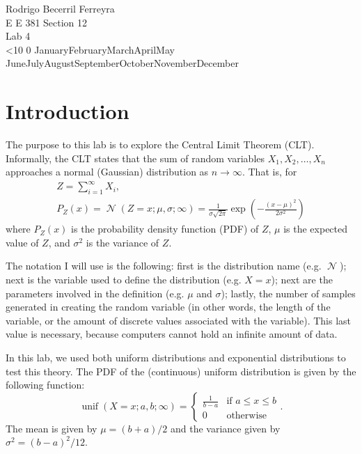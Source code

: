 \documentclass{article}
\renewcommand{\today}{\ifnum\number\day<10 0\fi \number\day \space%
\ifcase \month \or January\or February\or March\or April\or May%
\or June\or July\or August\or September\or October\or November\or December\fi\space%
\number \year}
\DeclareMathOperator{\norm}{\mathcal{N}}
\DeclareMathOperator{\unif}{unif}
\begin{document}
    \noindent
    Rodrigo Becerril Ferreyra\\
    E E 381 Section 12\\
    Lab 4\\
    \today

\section*{Introduction} The purpose to this lab is to explore
the Central Limit Theorem (CLT). Informally, the CLT states
that the sum of random variables \(X_1, X_2, \ldots, X_n\)
approaches a normal (Gaussian) distribution as \(n\to\infty\).
That is, for
\begin{gather*}
    Z = \sum_{i=1}^\infty X_i,\\
    P_Z(x) = \norm(Z = x; \mu, \sigma; \infty) = \frac1{\sigma\sqrt{2\pi}}\exp\left(-\frac{\left(x-\mu\right)^2}{2\sigma^2}\right)
\end{gather*} where \(P_Z(x)\) is the probability density
function (PDF) of \(Z\), \(\mu\) is the expected value of \(Z\),
and \(\sigma^2\) is the variance of \(Z\).

The notation I will use is the following: first is the
distribution name (e.g. \(\norm\)); next is the variable used to define
the distribution (e.g. \(X= x\)); next are the parameters
involved in the definition (e.g. \(\mu\) and \(\sigma\));
lastly, the number of samples generated in creating the
random variable (in other words, the length of the variable,
or the amount of discrete values associated with the variable).
This last value is necessary, because computers cannot
hold an infinite amount of data.

In this lab, we used both uniform distributions and
exponential distributions to test this theory. The PDF of the
(continuous) uniform distribution is given by the following
function:
\begin{equation*}
    \unif(X = x; a, b; \infty) =
    \begin{cases}
        \frac{1}{b-a} & \text{if } a \le x \le b\\
        0             & \text{otherwise}
    \end{cases}.
\end{equation*} The mean is given by \(\mu = (b+a)/2\) and
the variance given by \(\sigma^2 = (b-a)^2/12\).
\end{document}
